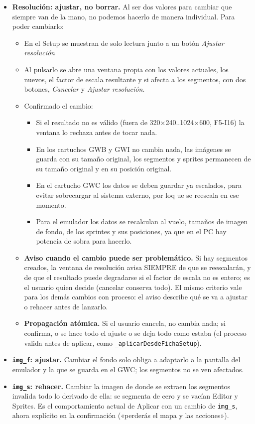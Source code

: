 \begin{itemize}
	\item \textbf{Resolución: ajustar, no borrar.} Al ser dos valores para cambiar que siempre van de la mano, no podemos hacerlo de manera individual. Para poder cambiarlo:
	\begin{itemize}
		\item En el Setup se muestran de solo lectura junto a un botón \emph{Ajustar resolución}
		\item Al pulsarlo se abre una ventana propia con los valores actuales, los nuevos, el factor de escala resultante y si afecta a los segmentos, con dos botones, \emph{Cancelar} y \emph{Ajustar resolución}.
		\item 	Confirmado el cambio:
		\begin{itemize}
			\item Si el resultado no es válido (fuera de 320$\times$240..1024$\times$600, F5-I16) la ventana lo rechaza antes de tocar nada.
			\item En los cartuchos GWB y GWI no cambia nada, las imágenes se guarda con su tamaño original, los segmentos y sprites permanecen de su tamaño original y en su posición original.
			\item En el cartucho GWC los datos se deben guardar ya escalados, para evitar sobrecargar al sistema externo, por loq ue se reescala en ese momento.
			\item Para el emulador los datos se recalculan al vuelo, tamaños de imagen de fondo, de los sprintes y sus posiciones, ya que en el PC hay potencia de sobra para hacerlo.
		\end{itemize}
		\item \textbf{Aviso cuando el cambio puede ser problemático.} Si hay segmentos creados, la ventana de resolución avisa SIEMPRE de que se reescalarán, y de que el resultado puede degradarse si el factor de escala no es entero; es el usuario quien decide (cancelar conserva todo). El mismo criterio vale para los demás cambios con proceso: el aviso describe qué se va a ajustar o rehacer antes de lanzarlo.
		\item \textbf{Propagación atómica.} Si el usuario cancela, no cambia nada; si confirma, o se hace todo el ajuste o se deja todo como estaba (el proceso valida antes de aplicar, como \texttt{\_aplicarDesdeFichaSetup}).
	\end{itemize}
	\item \textbf{\texttt{img\_f}: ajustar.} Cambiar el fondo solo obliga a adaptarlo a la pantalla del emulador y la que se guarda en el GWC; los segmentos no se ven afectados.
	\item \textbf{\texttt{img\_s}: rehacer.} Cambiar la imagen de donde se extraen los segmentos invalida todo lo derivado de ella: se segmenta de cero y se vacían Editor y Sprites. Es el comportamiento actual de Aplicar con un cambio de \texttt{img\_s}, ahora explícito en la confirmación («perderás el mapa y las acciones»).

\end{itemize}

